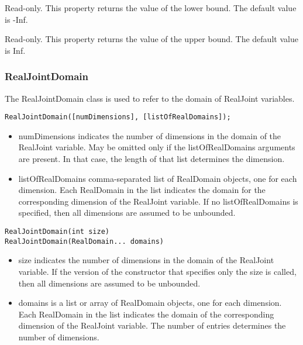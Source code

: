 Read-only.  This property returns the value of the lower bound.  The default value is -Inf.

\ifmatlab
{}
\fi
\ifjava
{}
\fi

Read-only.  This property returns the value of the upper bound.  The default value is Inf.



\subsubsection{RealJointDomain}
\label{sec:RealJointDomain}

The RealJointDomain class is used to refer to the domain of RealJoint variables.


\ifmatlab
\begin{lstlisting}
RealJointDomain([numDimensions], [listOfRealDomains]);
\end{lstlisting}

\begin{itemize}
\item numDimensions indicates the number of dimensions in the domain of the RealJoint variable.  May be omitted only if the listOfRealDomains arguments are present.  In that case, the length of that list determines the dimension.
\item listOfRealDomains comma-separated list of RealDomain objects, one for each dimension.  Each RealDomain in the list indicates the domain for the corresponding dimension of the RealJoint variable.  If no listOfRealDomains is specified, then all dimensions are assumed to be unbounded.
\end{itemize}
\fi

\ifjava
\begin{lstlisting}
RealJointDomain(int size)
RealJointDomain(RealDomain... domains)
\end{lstlisting}

\begin{itemize}
\item size indicates the number of dimensions in the domain of the RealJoint variable.  If the version of the constructor that specifies only the size is called, then all dimensions are assumed to be unbounded.
\item domains is a list or array of RealDomain objects, one for each dimension.  Each RealDomain in the list indicates the domain of the corresponding dimension of the RealJoint variable.  The number of entries determines the number of dimensions.
\end{itemize}
\fi

